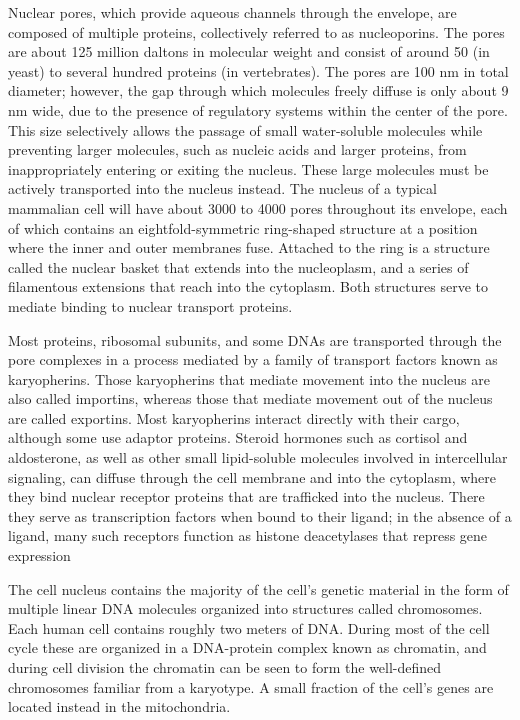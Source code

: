 Nuclear pores, which provide aqueous channels through the envelope, are composed of multiple proteins, collectively referred to as nucleoporins. The pores are about 125 million daltons in molecular weight and consist of around 50 (in yeast) to several hundred proteins (in vertebrates). The pores are 100 nm in total diameter; however, the gap through which molecules freely diffuse is only about 9 nm wide, due to the presence of regulatory systems within the center of the pore. This size selectively allows the passage of small water-soluble molecules while preventing larger molecules, such as nucleic acids and larger proteins, from inappropriately entering or exiting the nucleus. These large molecules must be actively transported into the nucleus instead. The nucleus of a typical mammalian cell will have about 3000 to 4000 pores throughout its envelope, each of which contains an eightfold-symmetric ring-shaped structure at a position where the inner and outer membranes fuse. Attached to the ring is a structure called the nuclear basket that extends into the nucleoplasm, and a series of filamentous extensions that reach into the cytoplasm. Both structures serve to mediate binding to nuclear transport proteins.

Most proteins, ribosomal subunits, and some DNAs are transported through the pore complexes in a process mediated by a family of transport factors known as karyopherins. Those karyopherins that mediate movement into the nucleus are also called importins, whereas those that mediate movement out of the nucleus are called exportins. Most karyopherins interact directly with their cargo, although some use adaptor proteins. Steroid hormones such as cortisol and aldosterone, as well as other small lipid-soluble molecules involved in intercellular signaling, can diffuse through the cell membrane and into the cytoplasm, where they bind nuclear receptor proteins that are trafficked into the nucleus. There they serve as transcription factors when bound to their ligand; in the absence of a ligand, many such receptors function as histone deacetylases that repress gene expression

The cell nucleus contains the majority of the cell's genetic material in the form of multiple linear DNA molecules organized into structures called chromosomes. Each human cell contains roughly two meters of DNA. During most of the cell cycle these are organized in a DNA-protein complex known as chromatin, and during cell division the chromatin can be seen to form the well-defined chromosomes familiar from a karyotype. A small fraction of the cell's genes are located instead in the mitochondria.

